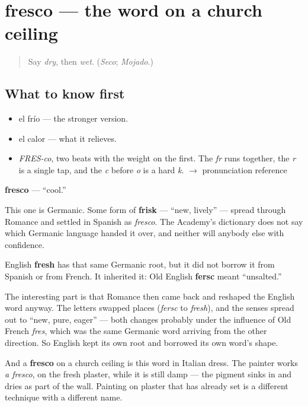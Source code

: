 \section[fresco]{fresco — the word on a church ceiling}

\label{lesson:ES-C379-fresco}



\begin{quote}
Say \emph{dry}, then \emph{wet}. (\emph{Seco}; \emph{Mojado}.)
\end{quote}

\subsection*{What to know first}
\begin{itemize}
\raggedright
  \item el frío — the stronger version.
  \item el calor — what it relieves.
\end{itemize}

\begin{sounds}
\begin{itemize}
\raggedright
  \item \emph{FRES-co}, two beats with the weight on the first. The \emph{fr} runs together, the \emph{r} is a single tap, and the \emph{c} before \emph{o} is a hard \emph{k}. $\to$ pronunciation reference
\end{itemize}
\end{sounds}

\begin{cousinweb}
\textbf{fresco} — \textquotedblleft{}cool.\textquotedblright{}

This one is Germanic. Some form of \textbf{frisk} — \textquotedblleft{}new, lively\textquotedblright{} — spread through Romance and settled in Spanish as \emph{fresco}. The Academy's dictionary does not say which Germanic language handed it over, and neither will anybody else with confidence.

English \textbf{fresh} has that same Germanic root, but it did not borrow it from Spanish or from French. It inherited it: Old English \textbf{fersc} meant \textquotedblleft{}unsalted.\textquotedblright{}

The interesting part is that Romance then came back and reshaped the English word anyway. The letters swapped places (\emph{fersc} to \emph{fresh}), and the senses spread out to \textquotedblleft{}new, pure, eager\textquotedblright{} — both changes probably under the influence of Old French \emph{fres}, which was the same Germanic word arriving from the other direction. So English kept its own root and borrowed its own word's shape.

And a \textbf{fresco} on a church ceiling is this word in Italian dress. The painter works \emph{a fresco}, on the fresh plaster, while it is still damp — the pigment sinks in and dries as part of the wall. Painting on plaster that has already set is a different technique with a different name.
\end{cousinweb}

